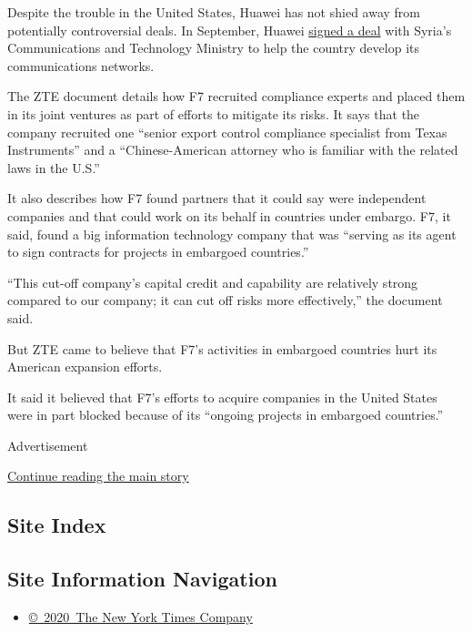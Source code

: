 Despite the trouble in the United States, Huawei has not shied away from
potentially controversial deals. In September, Huawei
\href{http://www.telecompaper.com/news/syria-huawei-ink-ict-deal--1104884}{signed
a deal} with Syria's Communications and Technology Ministry to help the
country develop its communications networks.

The ZTE document details how F7 recruited compliance experts and placed
them in its joint ventures as part of efforts to mitigate its risks. It
says that the company recruited one ``senior export control compliance
specialist from Texas Instruments'' and a ``Chinese-American attorney
who is familiar with the related laws in the U.S.''

It also describes how F7 found partners that it could say were
independent companies and that could work on its behalf in countries
under embargo. F7, it said, found a big information technology company
that was ``serving as its agent to sign contracts for projects in
embargoed countries.''

``This cut-off company's capital credit and capability are relatively
strong compared to our company; it can cut off risks more effectively,''
the document said.

But ZTE came to believe that F7's activities in embargoed countries hurt
its American expansion efforts.

It said it believed that F7's efforts to acquire companies in the United
States were in part blocked because of its ``ongoing projects in
embargoed countries.''

Advertisement

\protect\hyperlink{after-bottom}{Continue reading the main story}

\hypertarget{site-index}{%
\subsection{Site Index}\label{site-index}}

\hypertarget{site-information-navigation}{%
\subsection{Site Information
Navigation}\label{site-information-navigation}}

\begin{itemize}
\tightlist
\item
  \href{https://help.nytimes.com/hc/en-us/articles/115014792127-Copyright-notice}{©~2020~The
  New York Times Company}
\end{itemize}

